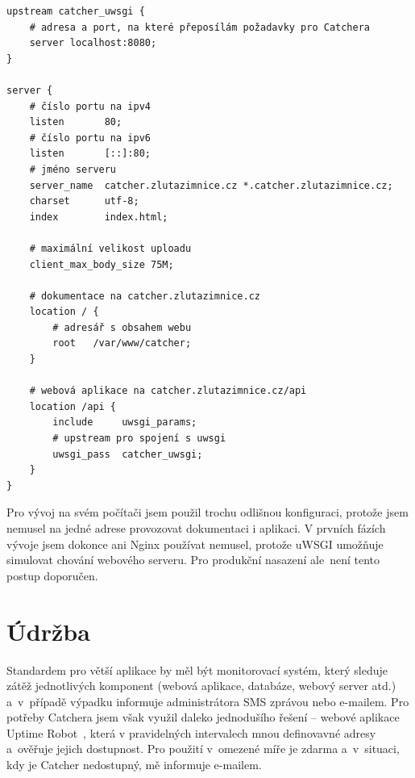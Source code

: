 \begingroup
\fontsize{9.5pt}{11pt}\selectfont
\begin{verbatim}
upstream catcher_uwsgi {
    # adresa a port, na které přeposílám požadavky pro Catchera
    server localhost:8080;
}

server {
    # číslo portu na ipv4
    listen       80;
    # číslo portu na ipv6
    listen       [::]:80;
    # jméno serveru
    server_name  catcher.zlutazimnice.cz *.catcher.zlutazimnice.cz;
    charset      utf-8;
    index        index.html;
    
    # maximální velikost uploadu
    client_max_body_size 75M;

    # dokumentace na catcher.zlutazimnice.cz
    location / {
        # adresář s obsahem webu
        root   /var/www/catcher;
    }

    # webová aplikace na catcher.zlutazimnice.cz/api
    location /api {
        include     uwsgi_params;
        # upstream pro spojení s uwsgi
        uwsgi_pass  catcher_uwsgi;
    }
}
\end{verbatim}
\endgroup

Pro vývoj na svém počítači jsem použil trochu odlišnou konfiguraci, protože
jsem nemusel na jedné adrese provozovat dokumentaci i aplikaci.
V prvních fázích vývoje jsem dokonce ani Nginx používat nemusel, protože uWSGI umožňuje simulovat
chování webového serveru.
Pro produkční nasazení ale~není tento postup doporučen.

\section{Údržba}

Standardem pro větší aplikace by měl být monitorovací systém,
který sleduje zátěž jednotlivých komponent (webová aplikace, databáze, webový server atd.)
a~v~případě výpadku informuje administrátora SMS zprávou nebo e-mailem.
Pro potřeby Catchera jsem však využil daleko jednodušího řešení -- webové aplikace Uptime Robot~\cite{uptime_robot},
která v pravidelných intervalech  mnou definovavné adresy a~ověřuje jejich dostupnost.
Pro použití v~omezené míře je zdarma a~v~situaci, kdy je Catcher nedostupný, mě informuje e-mailem.







